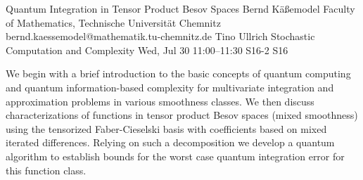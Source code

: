 \begin{talk}
  {Quantum Integration in Tensor Product  Besov Spaces}%
  {Bernd K\"a{\ss}emodel}%
  {Faculty of Mathematics, Technische Universit\"at Chemnitz}%
  {bernd.kaessemodel@mathematik.tu-chemnitz.de}%
  {Tino Ullrich}%
  {Stochastic Computation and Complexity}%
  {Wed, Jul 30 11:00--11:30}%
  {S16-2}%
  {S16}%
    

We begin with a brief introduction to the basic concepts of quantum computing and quantum information-based complexity for multivariate integration and approximation problems in various smoothness classes. We then discuss characterizations of functions in tensor product Besov spaces (mixed smoothness) using the tensorized Faber-Cieselski basis with coefficients based on mixed iterated differences. Relying on such a decomposition we develop a quantum algorithm to establish bounds for the worst case quantum integration error for this function class. 

\medskip
%
%
\end{talk}

